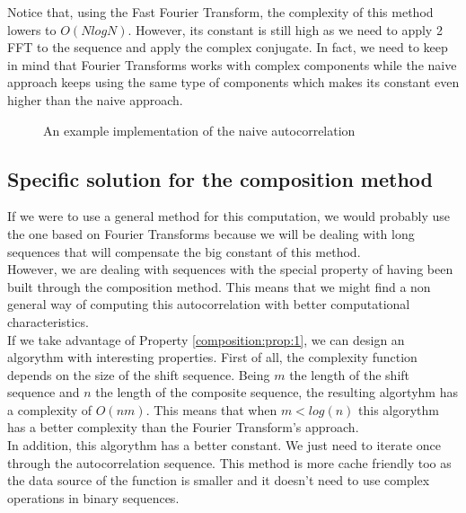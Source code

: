         Notice that, using the Fast Fourier
        Transform\cite{fast_fourier_transform}, the complexity of this
        method lowers to $O(N log N)$. However, its constant is
        still high as we need to apply 2 FFT to the sequence and apply the
        complex conjugate. In fact, we need to keep in mind that Fourier
        Transforms works with complex components while the naive approach keeps
        using the same type of components which makes its constant even higher
        than the naive approach.

          \begin{figure}
            \caption{An example implementation of the naive autocorrelation}
            \label{naive_auto:fig:1}
          \end{figure}

      \subsection{Specific solution for the composition method}

      If we were to use a general method for this computation, we would
      probably use the one based on Fourier Transforms because we will be
      dealing with long sequences that will compensate the big constant of
      this method.\\

      However, we are dealing with sequences with the special property of
      having been built through the composition method. This means that we
      might find a non general way of computing this autocorrelation with better
      computational characteristics.\\

      If we take advantage of Property \ref{composition:prop:1}, we can design
      an algorythm with interesting properties. First of all, the complexity
      function depends on the size of the shift sequence. Being $m$ the
      length of the shift sequence and $n$ the length of the composite
      sequence, the resulting algortyhm has a complexity of $O(nm)$. This means
      that when $m < log(n)$ this algorythm has a better complexity than the
      Fourier Transform's approach.\\

      In addition, this algorythm has a better constant. We just need to
      iterate once through the autocorrelation sequence. This method is more
      cache friendly too as the data source of the function is smaller and it
      doesn't need to use complex operations in binary sequences.\\


